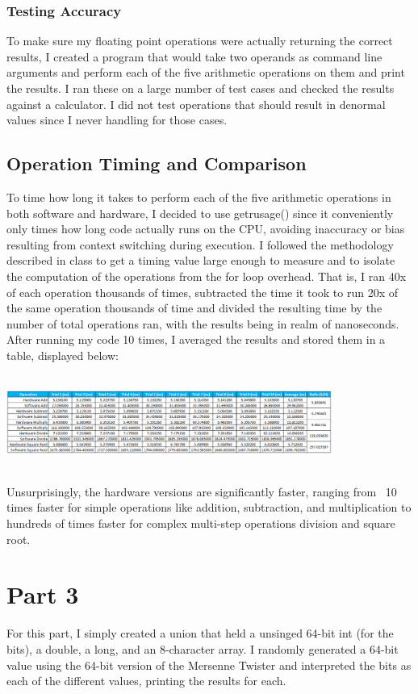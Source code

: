 \documentclass[12pt]{article}%
\begin{document}
\subsubsection{Testing Accuracy}
To make sure my floating point operations were actually returning the correct results, I created a program that would take two operands as command line arguments and perform each of the five arithmetic operations on them and print the results. I ran these on a large number of test cases and checked the results against a calculator. I did not test operations that should result in denormal values since I never handling for those cases.
\subsection{Operation Timing and Comparison}
To time how long it takes to perform each of the five arithmetic operations in both software and hardware, I decided to use getrusage() since it conveniently only times how long code actually runs on the CPU, avoiding inaccuracy or bias resulting from context switching during execution. I followed the methodology described in class to get a timing value large enough to measure and to isolate the computation of the operations from the for loop overhead. That is, I ran 40x of each operation thousands of times, subtracted the time it took to run 20x of the same operation thousands of time and divided the resulting time by the number of total operations ran, with the results being in realm of nanoseconds. After running my code 10 times, I averaged the results and stored them in a table, displayed below:\\ \\
\begin{minipage}{\linewidth}
\begin{center}
\includegraphics[width=0.8\textwidth]{timing_data.eps}
\end{center}
\end{minipage}
\\Unsurprisingly, the hardware versions are significantly faster, ranging from ~10 times faster for simple operations like addition, subtraction, and multiplication to hundreds of times faster for complex multi-step operations division and square root.
\section{Part 3}
For this part, I simply created a union that held a unsinged 64-bit int (for the bits), a double, a long, and an 8-character array. I randomly generated a 64-bit value using the 64-bit version of the Mersenne Twister and interpreted the bits as each of the different values, printing the results for each.
\end{document}
